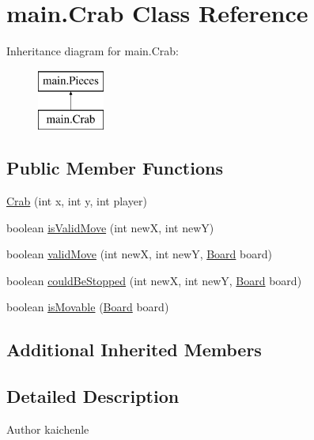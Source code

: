 \hypertarget{classmain_1_1_crab}{}\section{main.\+Crab Class Reference}
\label{classmain_1_1_crab}
Inheritance diagram for main.\+Crab\+:\begin{figure}[H]
\begin{center}
\leavevmode
\includegraphics[height=2.000000cm]{classmain_1_1_crab}
\end{center}
\end{figure}
\subsection*{Public Member Functions}
\begin{DoxyCompactItemize}
\item 
\mbox{\hyperlink{classmain_1_1_crab_a99412eb33f8d2d50f338381651d2228f}{Crab}} (int x, int y, int player)
\item 
boolean \mbox{\hyperlink{classmain_1_1_crab_a386a6f3c85fcaf998971570aeb9ea193}{is\+Valid\+Move}} (int newX, int newY)
\item 
boolean \mbox{\hyperlink{classmain_1_1_crab_a726d4e88d2f0e4942ed47ff40539974e}{valid\+Move}} (int newX, int newY, \mbox{\hyperlink{classmain_1_1_board}{Board}} board)
\item 
boolean \mbox{\hyperlink{classmain_1_1_crab_ac72368c64c168408bb92132db1119b31}{could\+Be\+Stopped}} (int newX, int newY, \mbox{\hyperlink{classmain_1_1_board}{Board}} board)
\item 
boolean \mbox{\hyperlink{classmain_1_1_crab_acc3712804963dc82ffc3f155f8753b41}{is\+Movable}} (\mbox{\hyperlink{classmain_1_1_board}{Board}} board)
\end{DoxyCompactItemize}
\subsection*{Additional Inherited Members}


\subsection{Detailed Description}
\begin{DoxyAuthor}{Author}
kaichenle 
\end{DoxyAuthor}


